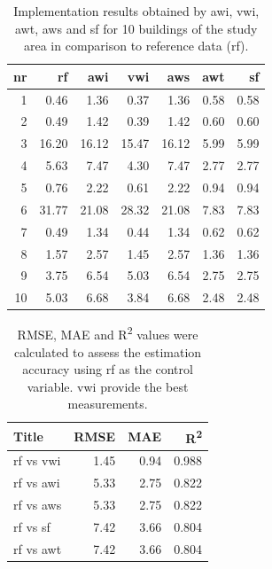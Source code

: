 \begin{table}

\caption{\label{tab:2rtbl-ltx}Implementation results obtained by awi, vwi, awt, aws and sf for 10 buildings of the study area in comparison to reference data (rf).}
\centering
\fontsize{7}{9}\selectfont
\begin{tabular}[t]{r|r|r|r|r|r|r}
\hline
nr & rf & awi & vwi & aws & awt & sf\\
\hline
1 & 0.46 & 1.36 & 0.37 & 1.36 & 0.58 & 0.58\\
\hline
2 & 0.49 & 1.42 & 0.39 & 1.42 & 0.60 & 0.60\\
\hline
3 & 16.20 & 16.12 & 15.47 & 16.12 & 5.99 & 5.99\\
\hline
4 & 5.63 & 7.47 & 4.30 & 7.47 & 2.77 & 2.77\\
\hline
5 & 0.76 & 2.22 & 0.61 & 2.22 & 0.94 & 0.94\\
\hline
6 & 31.77 & 21.08 & 28.32 & 21.08 & 7.83 & 7.83\\
\hline
7 & 0.49 & 1.34 & 0.44 & 1.34 & 0.62 & 0.62\\
\hline
8 & 1.57 & 2.57 & 1.45 & 2.57 & 1.36 & 1.36\\
\hline
9 & 3.75 & 6.54 & 5.03 & 6.54 & 2.75 & 2.75\\
\hline
10 & 5.03 & 6.68 & 3.84 & 6.68 & 2.48 & 2.48\\
\hline
\end{tabular}
\end{table}

\begin{table}

\caption{\label{tab:ertbl-ltx}RMSE, MAE and R\textsuperscript{2} values were calculated to assess the estimation accuracy using rf as the control variable. vwi provide the best measurements.}
\centering
\fontsize{7}{9}\selectfont
\begin{tabular}[t]{l|r|r|r}
\hline
Title & RMSE & MAE & R\textsuperscript{2}\\
\hline
rf vs vwi & 1.45 & 0.94 & 0.988\\
\hline
rf vs awi & 5.33 & 2.75 & 0.822\\
\hline
rf vs aws & 5.33 & 2.75 & 0.822\\
\hline
rf vs sf & 7.42 & 3.66 & 0.804\\
\hline
rf vs awt & 7.42 & 3.66 & 0.804\\
\hline
\end{tabular}
\end{table}

